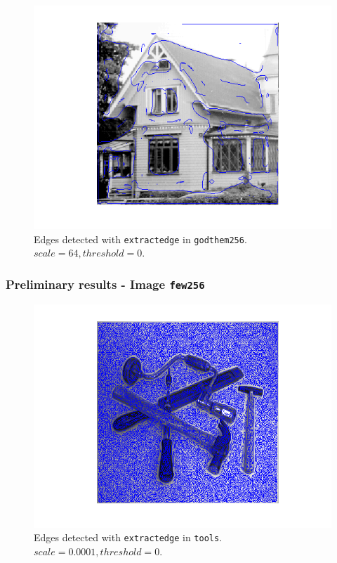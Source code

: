 \begin{figure}[H]
	\centering
	\includegraphics[scale=0.8]{./images/Q7/house/64_0.png}
	\caption{Edges detected with \texttt{extractedge} in \texttt{godthem256}. $scale = 64, threshold = 0$.}
	\label{fig:Q7_house_64_0}
\end{figure}


\subsubsection{Preliminary results - Image \texttt{few256}}

\begin{figure}[H]
	\centering
	\includegraphics[scale=0.8]{./images/Q7/tools/0.0001_0.png}
	\caption{Edges detected with \texttt{extractedge} in \texttt{tools}. $scale = 0.0001, threshold = 0$.}
	\label{fig:Q7_tools_0.0001_0}
\end{figure}

